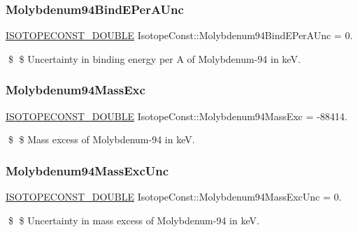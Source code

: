 \subsubsection{\texorpdfstring{Molybdenum94\+Bind\+E\+Per\+A\+Unc}{Molybdenum94BindEPerAUnc}}
{\footnotesize\ttfamily \mbox{\hyperlink{group___isotope_const-_macros_ga8f45a7272ce02c0b4c65c44636ed719a}{I\+S\+O\+T\+O\+P\+E\+C\+O\+N\+S\+T\+\_\+\+D\+O\+U\+B\+LE}} Isotope\+Const\+::\+Molybdenum94\+Bind\+E\+Per\+A\+Unc = 0.}

\$ \$ Uncertainty in binding energy per A of Molybdenum-\/94 in keV. \mbox{\label{group___isotope_const-_molybdenum-_mo94_ga28a3fbd2654aeeb5e52f84d8d36645f2}} 
\subsubsection{\texorpdfstring{Molybdenum94\+Mass\+Exc}{Molybdenum94MassExc}}
{\footnotesize\ttfamily \mbox{\hyperlink{group___isotope_const-_macros_ga8f45a7272ce02c0b4c65c44636ed719a}{I\+S\+O\+T\+O\+P\+E\+C\+O\+N\+S\+T\+\_\+\+D\+O\+U\+B\+LE}} Isotope\+Const\+::\+Molybdenum94\+Mass\+Exc = -\/88414.}

\$ \$ Mass excess of Molybdenum-\/94 in keV. \mbox{\label{group___isotope_const-_molybdenum-_mo94_ga5754e36bd9024a7226f35a0c1315dc28}} 
\subsubsection{\texorpdfstring{Molybdenum94\+Mass\+Exc\+Unc}{Molybdenum94MassExcUnc}}
{\footnotesize\ttfamily \mbox{\hyperlink{group___isotope_const-_macros_ga8f45a7272ce02c0b4c65c44636ed719a}{I\+S\+O\+T\+O\+P\+E\+C\+O\+N\+S\+T\+\_\+\+D\+O\+U\+B\+LE}} Isotope\+Const\+::\+Molybdenum94\+Mass\+Exc\+Unc = 0.}

\$ \$ Uncertainty in mass excess of Molybdenum-\/94 in keV. \mbox{\label{group___isotope_const-_molybdenum-_mo94_ga6bf1a2487431e5af447a8f5048d2ee7a}} 

